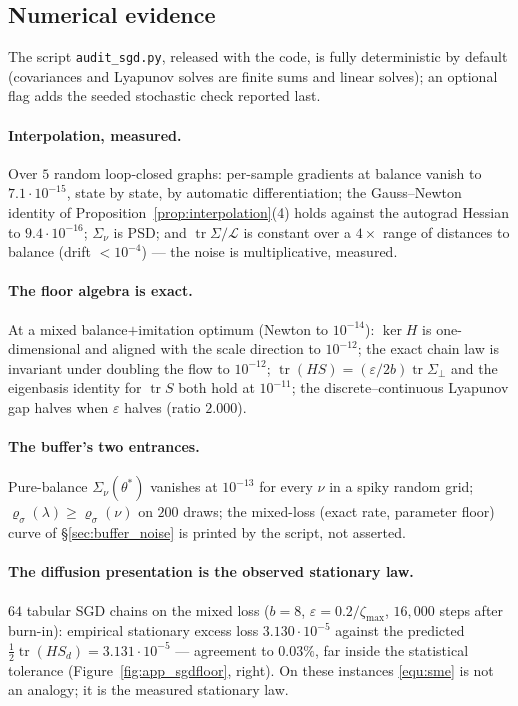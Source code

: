 \subsection{Numerical evidence}\label{sec:num_sgd}

The script \texttt{audit\_sgd.py}, released with the code, is fully deterministic by
default (covariances and Lyapunov solves are finite sums and linear solves); an optional
flag adds the seeded stochastic check reported last.

\paragraph{Interpolation, measured.}
Over $5$ random loop-closed graphs: per-sample gradients at balance vanish to
$7.1\cdot10^{-15}$, state by state, by automatic differentiation; the Gauss--Newton
identity of Proposition~\ref{prop:interpolation}(4) holds against the autograd Hessian
to $9.4\cdot10^{-16}$; $\Sigma_\nu$ is PSD; and
$\operatorname{tr}\Sigma/\mathcal L$ is constant over a $4\times$ range of distances to
balance (drift $<10^{-4}$) --- the noise is multiplicative, measured.

\paragraph{The floor algebra is exact.}
At a mixed balance$+$imitation optimum (Newton to $10^{-14}$): $\ker H$ is
one-dimensional and aligned with the scale direction to $10^{-12}$; the exact chain law
is invariant under doubling the flow to $10^{-12}$;
$\operatorname{tr}(HS)=(\varepsilon/2b)\operatorname{tr}\Sigma_\perp$ and the eigenbasis
identity for $\operatorname{tr}S$ both hold at $10^{-11}$; the discrete--continuous
Lyapunov gap halves when $\varepsilon$ halves (ratio $2.000$).

\paragraph{The buffer's two entrances.}
Pure-balance $\Sigma_\nu(\theta^*)$ vanishes at $10^{-13}$ for every $\nu$ in a spiky
random grid; $\varrho_\sigma(\lambda)\geq\varrho_\sigma(\nu)$ on $200$ draws; the
mixed-loss (exact rate, parameter floor) curve of \S\ref{sec:buffer_noise} is printed by
the script, not asserted.

\paragraph{The diffusion presentation is the observed stationary law.}
$64$ tabular SGD chains on the mixed loss ($b=8$, $\varepsilon=0.2/\zeta_{\max}$,
$16{,}000$ steps after burn-in): empirical stationary excess loss $3.130\cdot10^{-5}$
against the predicted $\tfrac12\operatorname{tr}(HS_d)=3.131\cdot10^{-5}$ --- agreement
to $0.03\%$, far inside the statistical tolerance
(Figure~\ref{fig:app_sgdfloor}, right). On these instances \eqref{equ:sme} is not an
analogy; it is the measured stationary law.


